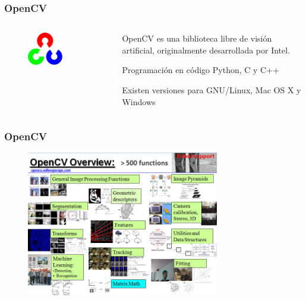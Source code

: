 \begin{frame}\frametitle{OpenCV}
  \begin{columns}
    \begin{column}{0.5\textwidth}
      \begin{figure}
        \centering
        \includegraphics[width=0.6\textwidth]{Figuras/OpenCVLogo.png}
      \end{figure}
    \end{column}
    \begin{column}{0.5\textwidth}
      OpenCV es una biblioteca libre de visión artificial, originalmente desarrollada por Intel.
      
      Programación en código  Python, C y C++
      
      Existen versiones para GNU/Linux, Mac OS X y Windows
    \end{column}
  \end{columns}
\end{frame}

\begin{frame}\frametitle{OpenCV}
\begin{figure}[h!]
  \centering
  \includegraphics[width=0.75\textwidth]{Figuras/OpenCVOverview.png}
\end{figure}
\end{frame}

